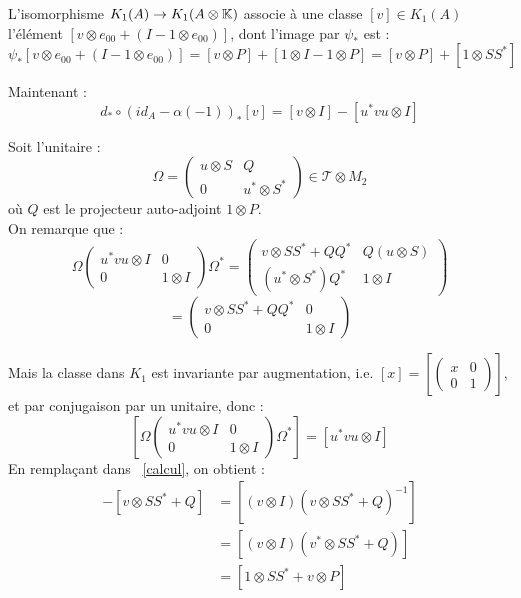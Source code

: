 \begin{dem}
L'isomorphisme $K_1(A)\rightarrow K_1(A\otimes\mathbb K)$ associe à une classe $[v]\in K_1(A)$ l'élément $[v\otimes e_{00}+(I-1\otimes e_{00})]$, dont l'image par $\psi_*$ est :
\begin{equation}\label{identite}\psi_*[v\otimes e_{00}+(I-1\otimes e_{00})]= [v\otimes P]+[1\otimes I-1\otimes P] = [v\otimes P]+[1\otimes SS^*]\end{equation}

Maintenant :
\begin{equation}\label{calcul}d_*\circ \left(id_A-\alpha(-1)\right)_*[v]= [ v\otimes I]-[ u^*vu\otimes I]\end{equation}

Soit l'unitaire :\quad\[\Omega = \begin{pmatrix}u\otimes S & Q \\ 0 & u^*\otimes S^*\end{pmatrix}\in \mathcal T \otimes M_2\]
où $Q$ est le projecteur auto-adjoint $1\otimes P$.\\

On remarque que :
\[\Omega\begin{pmatrix}u^*vu\otimes I & 0 \\ 0 & 1\otimes I\end{pmatrix}\Omega^*= \begin{pmatrix}v\otimes SS^* +QQ^*& Q(u\otimes S) \\ (u^*\otimes S^*)Q^* & 1\otimes I\end{pmatrix}\]
\[=\begin{pmatrix}v\otimes SS^* +QQ^*& 0 \\ 0 & 1\otimes I\end{pmatrix}\]


Mais la classe dans $K_1$ est invariante par augmentation, i.e. $[x]=\left[\begin{pmatrix}x& 0 \\ 0 & 1\end{pmatrix}\right]$, et par conjugaison par un unitaire, donc :
\[\left[\Omega\begin{pmatrix}u^*vu\otimes I & 0 \\ 0 & 1\otimes I\end{pmatrix}\Omega^*\right]=\left[u^*vu\otimes I\right]\]
En remplaçant dans ~\eqref{calcul}, on obtient :
\begin{align*}
[ v\otimes I]-[v\otimes SS^* +Q]& =[( v\otimes I)(v\otimes SS^* +Q)^{-1}]\\\
&=[(v\otimes I)(v^*\otimes SS^* +Q)]\\
&=[1\otimes SS^* +v\otimes P]
\end{align*}


\end{dem}
